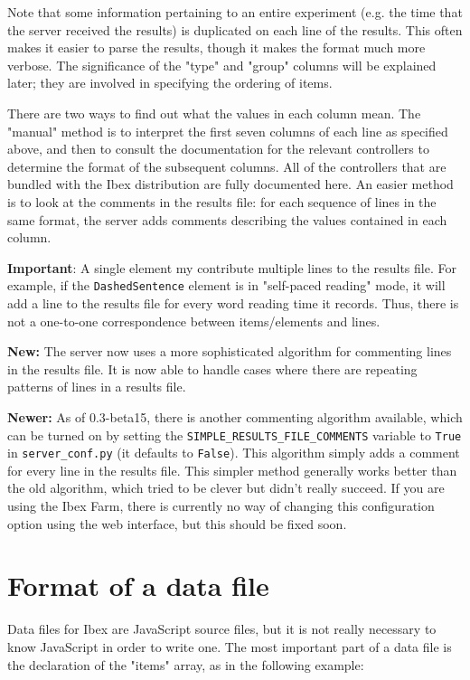 \documentclass[
]{article}
\begin{document}
Note that some information pertaining to an entire experiment (e.g. the
time that the server received the results) is duplicated on each line of
the results. This often makes it easier to parse the results, though it
makes the format much more verbose. The significance of the "type" and
"group" columns will be explained later; they are involved in specifying
the ordering of items.

There are two ways to find out what the values in each column mean. The
"manual" method is to interpret the first seven columns of each line as
specified above, and then to consult the documentation for the relevant
controllers to determine the format of the subsequent columns. All of
the controllers that are bundled with the Ibex distribution are fully
documented here. An easier method is to look at the comments in the
results file: for each sequence of lines in the same format, the server
adds comments describing the values contained in each column.

\textbf{Important}: A single element my contribute multiple lines to the
results file. For example, if the \texttt{DashedSentence} element is in
"self-paced reading" mode, it will add a line to the results file for
every word reading time it records. Thus, there is not a one-to-one
correspondence between items/elements and lines.

\textbf{New:} The server now uses a more sophisticated algorithm for
commenting lines in the results file. It is now able to handle cases
where there are repeating patterns of lines in a results file.

\textbf{Newer:} As of 0.3-beta15, there is another commenting algorithm
available, which can be turned on by setting the
\texttt{SIMPLE\_RESULTS\_FILE\_COMMENTS} variable to \texttt{True} in
\texttt{server\_conf.py} (it defaults to \texttt{False}). This algorithm
simply adds a comment for every line in the results file. This simpler
method generally works better than the old algorithm, which tried to be
clever but didn't really succeed. If you are using the Ibex Farm, there
is currently no way of changing this configuration option using the web
interface, but this should be fixed soon.

\hypertarget{format-of-a-data-file}{%
\section{Format of a data file}\label{format-of-a-data-file}}

Data files for Ibex are JavaScript source files, but it is not really
necessary to know JavaScript in order to write one. The most important
part of a data file is the declaration of the "items" array, as in the
following example:
\end{document}
